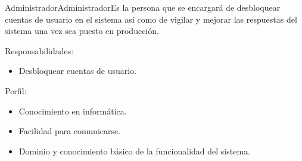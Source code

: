 \begin{Actor}{Administrador}{Administrador}{Es la persona que se encargará de desbloquear cuentas de usuario en el sistema así como de vigilar y mejorar las respuestas del sistema una vez sea puesto en producción.}
\item[Responsabilidades:]\hspace{1pt}
		\begin{itemize}
			\item Desbloquear cuentas de usuario.
		\end{itemize}
	\item[Perfil:]\hspace{1pt}
		\begin{itemize}
			\item Conocimiento en informática.
			\item Facilidad para comunicarse.
			\item Dominio y conocimiento básico de la funcionalidad del sistema.
		\end{itemize}

\end{Actor}


